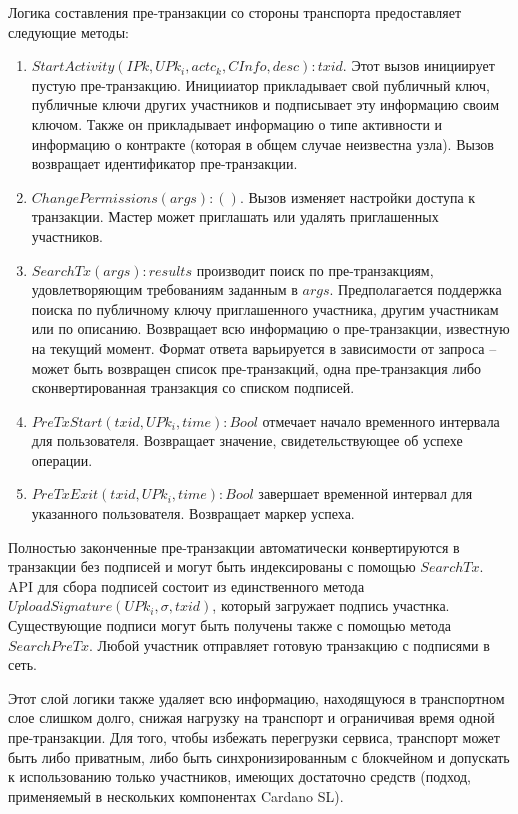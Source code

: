 \documentclass[specification,annotation]{itmo-student-thesis}
\begin{document}
Логика составления пре-транзакции со стороны транспорта предоставляет
следующие методы:
\begin{enumerate}
\item $StartActivity(IPk, {UPk_i}, actc_k, CInfo, desc) : txid$. Этот
  вызов инициирует пустую пре-транзакцию. Иницииатор прикладывает свой
  публичный ключ, публичные ключи других участников и подписывает эту
  информацию своим ключом. Также он прикладывает информацию о типе
  активности и информацию о контракте (которая в общем случае
  неизвестна узла). Вызов возвращает идентификатор пре-транзакции.
\item $ChangePermissions(args) : ()$. Вызов изменяет настройки
  доступа к транзакции. Мастер может приглашать или удалять
  приглашенных участников.
\item $SearchTx(args) : results$ производит поиск по пре-транзакциям,
  удовлетворяющим требованиям заданным в $args$. Предполагается
  поддержка поиска по публичному ключу приглашенного участника, другим
  участникам или по описанию.  Возвращает всю информацию о
  пре-транзакции, известную на текущий момент. Формат ответа
  варьируется в зависимости от запроса -- может быть возвращен список
  пре-транзакций, одна пре-транзакция либо сконвертированная
  транзакция со списком подписей.
\item $PreTxStart(txid, UPk_i, time) : Bool$ отмечает начало
  временного интервала для пользователя. Возвращает значение,
  свидетельствующее об успехе операции.
\item $PreTxExit(txid, UPk_i, time) : Bool$ завершает временной
  интервал для указанного пользователя. Возвращает маркер успеха.
\end{enumerate}

Полностью законченные пре-транзакции автоматически конвертируются в
транзакции без подписей и могут быть индексированы с помощью
$SearchTx$. API для сбора подписей состоит из единственного метода
$UploadSignature(UPk_i, \sigma, txid)$, который загружает подпись
участнка. Существующие подписи могут быть получены также с помощью
метода $SearchPreTx$. Любой участник отправляет готовую транзакцию с
подписями в сеть.

Этот слой логики также удаляет всю информацию, находящуюся в
транспортном слое слишком долго, снижая нагрузку на транспорт и
ограничивая время одной пре-транзакции. Для того, чтобы избежать
перегрузки сервиса, транспорт может быть либо приватным, либо быть
синхронизированным с блокчейном и допускать к использованию только
участников, имеющих достаточно средств (подход, применяемый в
нескольких компонентах Cardano SL).
\end{document}
